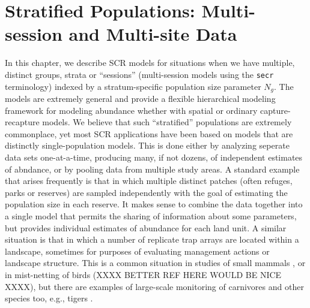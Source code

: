 \chapter{Stratified Populations: 
Multi-session and Multi-site Data}
\label{chapt.hscr}

\vspace{0.3cm}


In this chapter, we describe SCR models for situations when we have
multiple, distinct groups, strata or ``sessions'' (multi-session
models using the \mbox{\tt secr} terminology) indexed by a
stratum-specific population size parameter $N_{g}$. The models are
extremely general and provide a flexible hierarchical modeling
framework for modeling abundance \citep{converse_royle:2012,
  royle_etal:2012arXiv} whether with spatial or ordinary
capture-recapture models.  We believe that such ``stratified''
populations are extremely commonplace, yet most SCR applications have
been based on models that are distinctly single-population
models. This is done either by analyzing seperate data sets
one-at-a-time, producing many, if not dozens, of independent estimates
of abndance, or by pooling data from multiple study areas.  A standard
example that arises frequently is that in which multiple distinct
patches (often refuges, parks or reserves) are sampled independently
with the goal of estimating the population size in each reserve. It
makes sense to combine the data together into a single model that
permits the sharing of information about some parameters, but provides
individual estimates of abundance for each land unit.  A similar
situation is that in which a number of replicate trap arrays are
located within a landscape, sometimes for purposes of evaluating
management actions or landscape structure. This is a common situation
in studies of small mammals \citep{converse_etal:2006jwm,
  converse_etal:2006ea, converse_royle:2012}, or in mist-netting of
birds \citep{desante_etal:1995} (XXXX BETTER REF HERE WOULD BE NICE
XXXX), but there are examples of large-scale monitoring of carnivores
and other species too, e.g., tigers \citep{jhala_etal:2011}.

